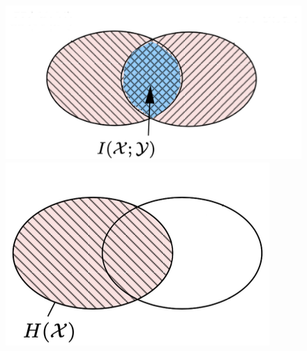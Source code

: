 \documentclass[titlepage]{article}
\begin{document}
\begin{figure}[h!]
    \begin{minipage}{.5\textwidth}
        \centering
        \includegraphics[scale = 0.7]{mutualinfo.png}
    \end{minipage}
    \hspace{0.2cm}
    \begin{minipage}{.5\textwidth}
        \centering
        \includegraphics[scale = 0.7]{entropyx.png}
    \end{minipage}
\end{figure}
\end{document}
